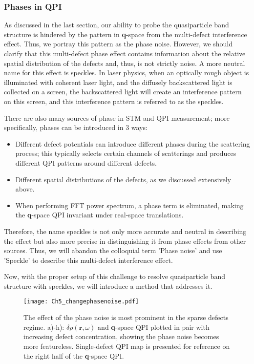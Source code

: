 \subsubsection{Phases in QPI}
As discussed in the last section, our ability to probe the quasiparticle band structure is hindered by the pattern in \textbf{q}-space from the multi-defect interference effect. Thus, we portray this pattern as the phase noise. However, we should clarify that this multi-defect phase effect contains information about the relative spatial distribution of the defects and, thus, is not strictly noise. A more neutral name for this effect is speckles. In laser physics, when an optically rough object is illuminated with coherent laser light, and the diffusely backscattered light is collected on a screen, the backscattered light will create an interference pattern on this screen, and this interference pattern is referred to as the speckles\cite{ReviewLaserSpeckle}.

There are also many sources of phase in \ac{STM} and \ac{QPI} measurement; more specifically, phases can be introduced in 3 ways: 
\begin{itemize}
	\item Different defect potentials can introduce different phases during the scattering process; this typically selects certain channels of scatterings and produces different QPI patterns around different defects. \cite{chenAtomicallyResolvedDefectEngineering2024}
	\item Different spatial distributions of the defects, as we discussed extensively above. 
	\item When performing FFT power spectrum, a phase term is eliminated, making the \textbf{q}-space \ac{QPI} invariant under real-space translations.
\end{itemize}

Therefore, the name speckles is not only more accurate and neutral in describing the effect but also more precise in distinguishing it from phase effects from other sources. Thus, we will abandon the colloquial term 'Phase noise' and use 'Speckle' to describe this multi-defect interference effect. 

Now, with the proper setup of this challenge to resolve quasiparticle band structure with speckles, we will introduce a method that addresses it. 

\begin{figure}
	\texttt{[image: Ch5\_changephasenoise.pdf]} 
	\centering
	\caption{The effect of the phase noise is most prominent in the sparse defects regime. a)-h): $\delta\rho(\textbf{r},\omega)$ and \textbf{q}-space QPI plotted in pair with increasing defect concentration, showing the phase noise becomes more featureless. Single-defect QPI map is presented for reference on the right half of the \textbf{q}-space QPI.}
	\label{fig:ch5_changephasenoise}
\end{figure}